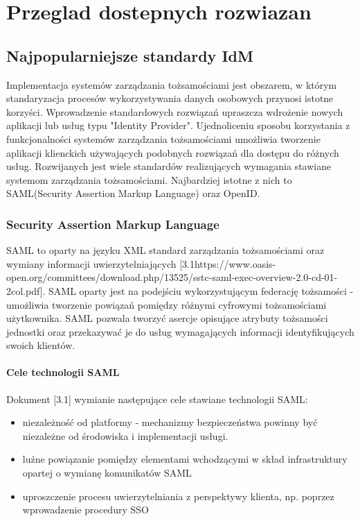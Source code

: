 \chapter{Przeglad dostepnych rozwiazan}
\label{cha:przegladRozwiazan}


\section{Najpopularniejsze standardy IdM}
\label{sec:standardyIdM}

Implementacja systemów zarządzania tożsamościami jest obszarem, w którym standaryzacja procesów wykorzystywania danych osobowych przynosi istotne korzyści. Wprowadzenie standardowych rozwiązań upraszcza wdrożenie nowych aplikacji lub usług typu "Identity Provider". Ujednoliceniu sposobu korzystania z funkcjonalności systemów zarządzania tożsamościami umożliwia tworzenie aplikacji klienckich używających podobnych rozwiązań dla dostępu do różnych usług. Rozwijanych jest wiele standardów realizujących wymagania stawiane systemom zarządzania tożsamościami. Najbardziej istotne z nich to SAML(Security Assertion Markup Language) oraz OpenID. 

\subsection{Security Assertion Markup Language}

SAML to oparty na języku XML standard zarządzania tożsamościami oraz wymiany informacji uwierzytelniających [3.1https://www.oasis-open.org/committees/download.php/13525/sstc-saml-exec-overview-2.0-cd-01-2col.pdf]. SAML oparty jest na podejściu wykorzystującym federację tożsamości - umożliwia tworzenie powiązań pomiędzy różnymi cyfrowymi tożsamościami użytkownika. SAML pozwala tworzyć asercje opisujące atrybuty tożsamości jednostki oraz przekazywać je do usług wymagających informacji identyfikujących swoich klientów.

\subsubsection{Cele technologii SAML}

Dokument [3.1] wymianie następujące cele stawiane technologii SAML:

\begin{itemize}
  \item niezależność od platformy - mechanizmy bezpieczeństwa powinny być niezależne od środowiska i implementacji usługi.
  \item luźne powiązanie pomiędzy elementami wchodzącymi w skład infrastruktury opartej o wymianę komunikatów SAML
  \item uproszczenie procesu uwierzytelniania z perspektywy klienta, np. poprzez wprowadzenie procedury SSO
\end{itemize}


